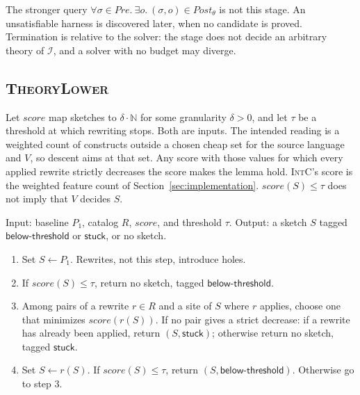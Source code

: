 The stronger query \(\forall \sigma \in \mathit{Pre}.\ \exists o.\
(\sigma, o) \in \mathit{Post}_\theta\) is not this stage. An unsatisfiable
harness is discovered later, when no candidate is proved. Termination is
relative to the solver: the stage does not decide an arbitrary theory of
\(\mathcal{I}\), and a solver with no budget may diverge.

\subsection{\textsc{TheoryLower}}

Let \(\mathit{score}\) map sketches to \(\delta\cdot\mathbb{N}\) for some
granularity \(\delta > 0\), and let \(\tau\) be a threshold at which
rewriting stops. Both are inputs. The intended reading is a weighted count
of constructs outside a chosen cheap set for the source language and
\(V\), so descent aims at that set. Any score with those values for which
every applied rewrite strictly decreases the score makes the lemma hold.
\textsc{IntC}'s score is the weighted feature count of
Section~\ref{sec:implementation}. \(\mathit{score}(S) \le \tau\) does not
imply that \(V\) decides \(S\).

\begin{algo}
\label{alg:theorylower}
Input: baseline \(P_1\), catalog \(R\), \(\mathit{score}\), and
threshold \(\tau\).
Output: a sketch \(S\) tagged \(\mathsf{below\text{-}threshold}\) or
\(\mathsf{stuck}\), or no sketch.
\begin{enumerate}
  \item Set \(S \gets P_1\). Rewrites, not this step, introduce holes.
  \item If \(\mathit{score}(S) \le \tau\), return no sketch, tagged
  \(\mathsf{below\text{-}threshold}\).
  \item Among pairs of a rewrite \(r \in R\) and a site of \(S\) where
  \(r\) applies, choose one that minimizes \(\mathit{score}(r(S))\). If no
  pair gives a strict decrease: if a rewrite has already been applied,
  return \((S, \mathsf{stuck})\); otherwise return no sketch, tagged
  \(\mathsf{stuck}\).
  \item Set \(S \gets r(S)\). If \(\mathit{score}(S) \le \tau\), return
  \((S, \mathsf{below\text{-}threshold})\). Otherwise go to step 3.
\end{enumerate}
\end{algo}

